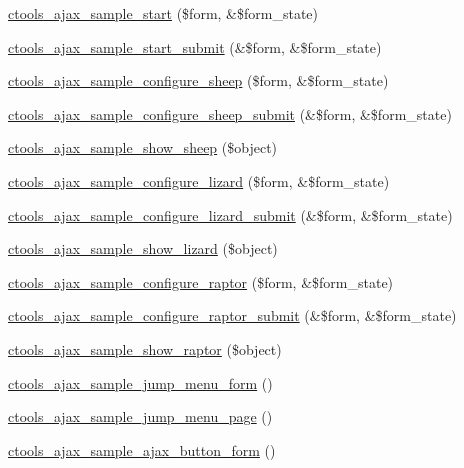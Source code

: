 \begin{DoxyCompactItemize}
\item 
\hyperlink{ctools__ajax__sample_8module_a4a7fe81f89749aa7000d838dc1b1cb25}{ctools\_\-ajax\_\-sample\_\-start} (\$form, \&\$form\_\-state)
\item 
\hyperlink{ctools__ajax__sample_8module_ae756b86e56bb8ece58fd9d63db0c4ea0}{ctools\_\-ajax\_\-sample\_\-start\_\-submit} (\&\$form, \&\$form\_\-state)
\item 
\hyperlink{ctools__ajax__sample_8module_a9a7995b3c7c7bc897dc93e13826afee0}{ctools\_\-ajax\_\-sample\_\-configure\_\-sheep} (\$form, \&\$form\_\-state)
\item 
\hyperlink{ctools__ajax__sample_8module_ac9642bcbaaa5f8326b4dcca3e0fafba4}{ctools\_\-ajax\_\-sample\_\-configure\_\-sheep\_\-submit} (\&\$form, \&\$form\_\-state)
\item 
\hyperlink{ctools__ajax__sample_8module_af676698c9d90e20a7b32e01e0c592233}{ctools\_\-ajax\_\-sample\_\-show\_\-sheep} (\$object)
\item 
\hyperlink{ctools__ajax__sample_8module_a075b0e76b260b34776c3c543d64eaf7a}{ctools\_\-ajax\_\-sample\_\-configure\_\-lizard} (\$form, \&\$form\_\-state)
\item 
\hyperlink{ctools__ajax__sample_8module_a5476dfb135b8f3a8938a4f9598c11012}{ctools\_\-ajax\_\-sample\_\-configure\_\-lizard\_\-submit} (\&\$form, \&\$form\_\-state)
\item 
\hyperlink{ctools__ajax__sample_8module_a7eb8f876ab92d908b1d3ecd5d0da2bf2}{ctools\_\-ajax\_\-sample\_\-show\_\-lizard} (\$object)
\item 
\hyperlink{ctools__ajax__sample_8module_a037c9a9adb5a1c6ddf8be37df40eb148}{ctools\_\-ajax\_\-sample\_\-configure\_\-raptor} (\$form, \&\$form\_\-state)
\item 
\hyperlink{ctools__ajax__sample_8module_a1cc65cbf5875407391d9bd476e561160}{ctools\_\-ajax\_\-sample\_\-configure\_\-raptor\_\-submit} (\&\$form, \&\$form\_\-state)
\item 
\hyperlink{ctools__ajax__sample_8module_ac004d0a7838e3d8fac6d5f3002c6f4d5}{ctools\_\-ajax\_\-sample\_\-show\_\-raptor} (\$object)
\item 
\hyperlink{ctools__ajax__sample_8module_a9de049c962e99f834ee87f18bb9dbf1f}{ctools\_\-ajax\_\-sample\_\-jump\_\-menu\_\-form} ()
\item 
\hyperlink{ctools__ajax__sample_8module_af23a20933624c63ac37e7f6346c47353}{ctools\_\-ajax\_\-sample\_\-jump\_\-menu\_\-page} ()
\item 
\hyperlink{ctools__ajax__sample_8module_ae0f1db00a06daf20916bafe72305d5f9}{ctools\_\-ajax\_\-sample\_\-ajax\_\-button\_\-form} ()
\end{DoxyCompactItemize}


